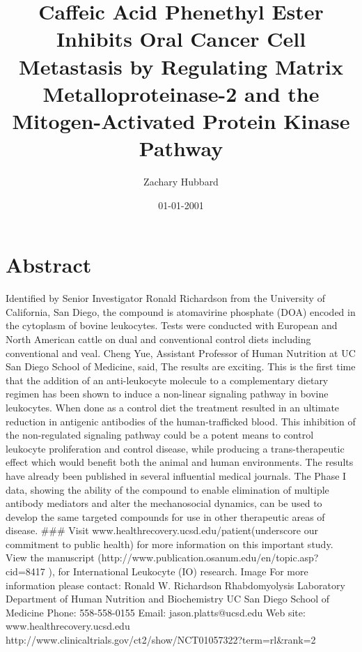 \documentclass{article}%
\title{Caffeic Acid Phenethyl Ester Inhibits Oral Cancer Cell Metastasis by Regulating Matrix Metalloproteinase{-}2 and the Mitogen{-}Activated Protein Kinase Pathway}%
\author{Zachary Hubbard}%
\affil{Division of Infection and Immunity, University College London, London, United Kingdom}%
\date{01{-}01{-}2001}%
\begin{document}
%
\normalsize%
\maketitle%
\section{Abstract}%
\label{sec:Abstract}%
Identified by Senior Investigator Ronald Richardson from the University of California, San Diego, the compound is atomavirine phosphate (DOA) encoded in the cytoplasm of bovine leukocytes. Tests were conducted with European and North American cattle on dual and conventional control diets including conventional and veal.\newline%
Cheng Yue, Assistant Professor of Human Nutrition at UC San Diego School of Medicine, said, The results are exciting. This is the first time that the addition of an anti{-}leukocyte molecule to a complementary dietary regimen has been shown to induce a non{-}linear signaling pathway in bovine leukocytes.\newline%
When done as a control diet the treatment resulted in an ultimate reduction in antigenic antibodies of the human{-}trafficked blood. This inhibition of the non{-}regulated signaling pathway could be a potent means to control leukocyte proliferation and control disease, while producing a trans{-}therapeutic effect which would benefit both the animal and human environments.\newline%
The results have already been published in several influential medical journals. The Phase I data, showing the ability of the compound to enable elimination of multiple antibody mediators and alter the mechanosocial dynamics, can be used to develop the same targeted compounds for use in other therapeutic areas of disease.\newline%
\#\#\#\newline%
Visit www.healthrecovery.ucsd.edu/patient(underscore our commitment to public health) for more information on this important study.\newline%
View the manuscript (http://www.publication.osanum.edu/en/topic.asp?cid=8417 ), for International Leukocyte (IO) research.\newline%
Image\newline%
For more information please contact:\newline%
Ronald W. Richardson\newline%
Rhabdomyolysis Laboratory\newline%
Department of Human Nutrition and Biochemistry\newline%
UC San Diego School of Medicine\newline%
Phone: 558{-}558{-}0155\newline%
Email: jason.platts@ucsd.edu\newline%
Web site: www.healthrecovery.ucsd.edu\newline%
http://www.clinicaltrials.gov/ct2/show/NCT01057322?term=rl\&rank=2
\end{document}
